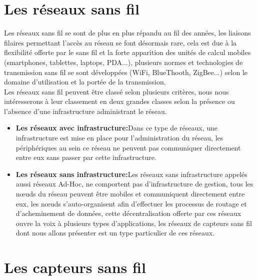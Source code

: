 \section{Les réseaux sans fil} 
 Les réseaux sans fil se sont de plus en plus répandu au fil des années, les liaisons filaires permettant l'accès au réseau se font désormais rare, cela est due à la flexibilité offerte par le sans fil et la forte apparition des  unités de calcul mobiles (smartphones, tablettes, laptops, PDA...), plusieurs normes et  technologies de transmission sans fil se sont développées (WiFi, BlueThooth, ZigBee...) selon le domaine d'utilisation et la portée de la transmission.\\
 Les réseaux sans fil peuvent être classé selon plusieurs critères, nous nous intéresserons à leur classement  en deux grandes classes selon la présence ou l'absence d'une infrastructure administrant le réseau.
\begin{itemize}
\item \textbf{Les réseaux avec infrastructure:}Dans ce type de réseaux, une infrastructure est mise en place pour l'administration du réseau, les périphériques au sein ce réseau ne peuvent pas communiquer directement entre eux sans passer par cette infrastructure. 

\item \textbf{Les réseaux sans infrastructure:}Les réseaux sans infrastructure appelés aussi réseaux Ad-Hoc, ne comportent pas d'infrastructure de gestion, tous les nœuds du réseau peuvent être mobiles et communiquent directement entre eux, les nœuds s'auto-organisent afin d'effectuer les processus de routage et d'acheminement de données, cette décentralisation offerte par ces réseaux ouvre la voix à plusieurs types d'applications, les réseaux de capteurs sans fil dont nous allons présenter est un type particulier de ces réseaux.
\end{itemize}
\section{Les capteurs sans fil}
